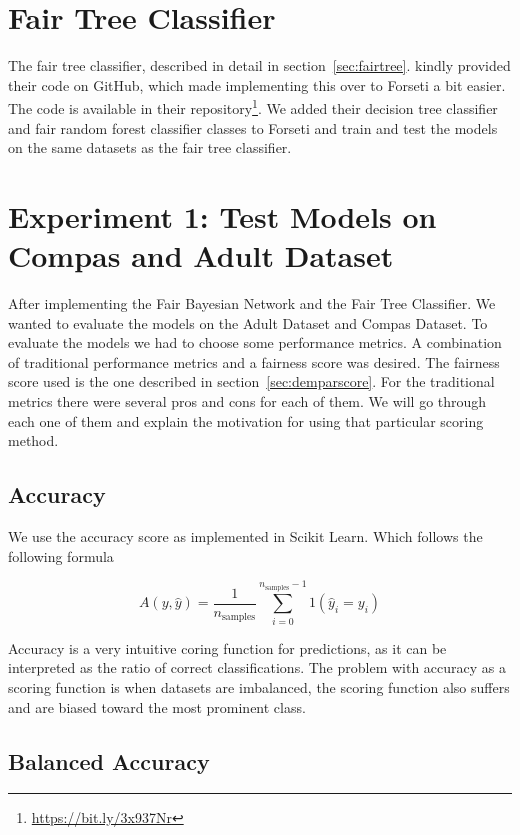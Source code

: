 \section{Fair Tree Classifier}
The fair tree classifier, described in detail in section~\ref{sec:fairtree}. \citet{Antonio:2021:arXiv} kindly provided their code on GitHub, which made implementing this over to Forseti a bit easier. The code is available in their repository\footnote{\url{https://bit.ly/3x937Nr}}. We added their decision tree classifier and fair random forest classifier classes to Forseti and train and test the models on the same datasets as the fair tree classifier.

\section{Experiment 1: Test Models on Compas and Adult Dataset}

After implementing the Fair Bayesian Network and the Fair Tree Classifier. We wanted to evaluate the models on the Adult Dataset and Compas Dataset. To evaluate the models we had to choose some performance metrics. A combination of traditional performance metrics and a fairness score was desired. The fairness score used is the one described in section~\ref{sec:demparscore}. For the traditional metrics there were several pros and cons for each of them. We will go through each one of them and explain the motivation for using that particular scoring method.

\subsection{Accuracy}

We use the accuracy score as implemented in Scikit Learn. Which follows the following formula

\begin{equation*}
    A(y, \hat{y}) = \frac{1}{n_\text{samples}} \sum_{i=0}^{n_\text{samples} - 1} 1(\hat{y}_i = y_i)
\end{equation*}

Accuracy is a very intuitive coring function for predictions, as it can be interpreted as the ratio of correct classifications. The problem with accuracy as a scoring function is when datasets are imbalanced, the scoring function also suffers and are biased toward the most prominent class.

\subsection{Balanced Accuracy}

